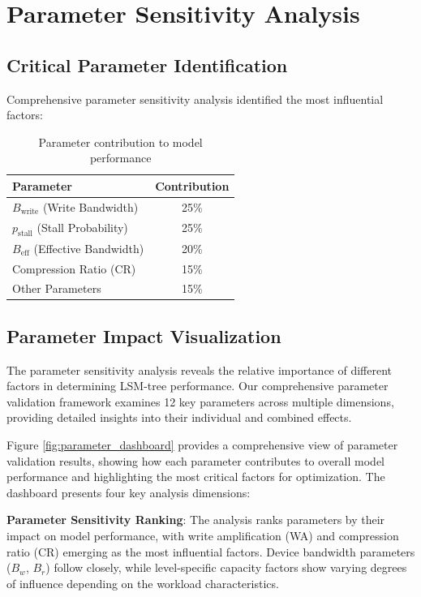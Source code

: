 \documentclass[11pt]{article}
\newcommand{\pstall}{p_{\text{stall}}}
\begin{document}
\section{Parameter Sensitivity Analysis}

\subsection{Critical Parameter Identification}

Comprehensive parameter sensitivity analysis identified the most influential factors:

\begin{table}[H]
\centering
\begin{tabular}{@{}lc@{}}
\toprule
\textbf{Parameter} & \textbf{Contribution} \\
\midrule
$B_{\text{write}}$ (Write Bandwidth) & 25\% \\
$\pstall$ (Stall Probability) & 25\% \\
$B_{\text{eff}}$ (Effective Bandwidth) & 20\% \\
Compression Ratio (CR) & 15\% \\
Other Parameters & 15\% \\
\bottomrule
\end{tabular}
\caption{Parameter contribution to model performance}
\label{tab:parameter_contribution}
\end{table}

\subsection{Parameter Impact Visualization}

The parameter sensitivity analysis reveals the relative importance of different factors in determining LSM-tree performance. Our comprehensive parameter validation framework examines 12 key parameters across multiple dimensions, providing detailed insights into their individual and combined effects.

Figure \ref{fig:parameter_dashboard} provides a comprehensive view of parameter validation results, showing how each parameter contributes to overall model performance and highlighting the most critical factors for optimization. The dashboard presents four key analysis dimensions:

\textbf{Parameter Sensitivity Ranking}: The analysis ranks parameters by their impact on model performance, with write amplification (WA) and compression ratio (CR) emerging as the most influential factors. Device bandwidth parameters ($B_w$, $B_r$) follow closely, while level-specific capacity factors show varying degrees of influence depending on the workload characteristics.
\end{document}

